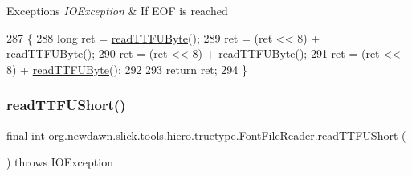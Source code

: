\begin{DoxyExceptions}{Exceptions}
{\em I\+O\+Exception} & If E\+OF is reached \\
\hline
\end{DoxyExceptions}

\begin{DoxyCode}
287                                                         \{
288         \textcolor{keywordtype}{long} ret = \mbox{\hyperlink{classorg_1_1newdawn_1_1slick_1_1tools_1_1hiero_1_1truetype_1_1_font_file_reader_af208587b367fbf19afbfd0cb584b7563}{readTTFUByte}}();
289         ret = (ret << 8) + \mbox{\hyperlink{classorg_1_1newdawn_1_1slick_1_1tools_1_1hiero_1_1truetype_1_1_font_file_reader_af208587b367fbf19afbfd0cb584b7563}{readTTFUByte}}();
290         ret = (ret << 8) + \mbox{\hyperlink{classorg_1_1newdawn_1_1slick_1_1tools_1_1hiero_1_1truetype_1_1_font_file_reader_af208587b367fbf19afbfd0cb584b7563}{readTTFUByte}}();
291         ret = (ret << 8) + \mbox{\hyperlink{classorg_1_1newdawn_1_1slick_1_1tools_1_1hiero_1_1truetype_1_1_font_file_reader_af208587b367fbf19afbfd0cb584b7563}{readTTFUByte}}();
292 
293         \textcolor{keywordflow}{return} ret;
294     \}
\end{DoxyCode}
\mbox{\label{classorg_1_1newdawn_1_1slick_1_1tools_1_1hiero_1_1truetype_1_1_font_file_reader_a3e37dc36dda05c50af2f546cb377af6c}} 
\subsubsection{\texorpdfstring{read\+T\+T\+F\+U\+Short()}{readTTFUShort()}\hspace{0.1cm}{\footnotesize\ttfamily [1/2]}}
{\footnotesize\ttfamily final int org.\+newdawn.\+slick.\+tools.\+hiero.\+truetype.\+Font\+File\+Reader.\+read\+T\+T\+F\+U\+Short (\begin{DoxyParamCaption}{ }\end{DoxyParamCaption}) throws I\+O\+Exception\hspace{0.3cm}{\ttfamily [inline]}}

